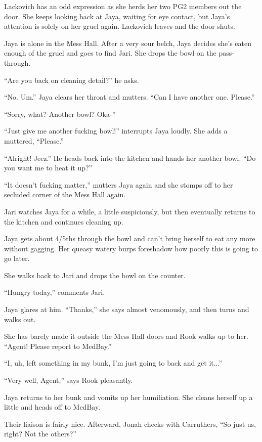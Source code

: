 Lackovich has an odd expression as she herds her two PG2 members out the door.  She keeps looking back at Jaya, waiting for eye contact, but Jaya's attention is solely on her gruel again.  Lackovich leaves and the door shuts.

Jaya is alone in the Mess Hall.  After a very sour belch, Jaya decides she's eaten enough of the gruel and goes to find Jari.  She drops the bowl on the pass-through.

``Are you back on cleaning detail?'' he asks.

``No.  Um.''  Jaya clears her throat and mutters.  ``Can I have another one.  Please.''

``Sorry, what?  Another bowl?  Oka-''

``Just give me another fucking bowl!'' interrupts Jaya loudly.  She adds a muttered, ``Please.''

``Alright!  Jeez.''  He heads back into the kitchen and hands her another bowl.  ``Do you want me to heat it up?''

``It doesn't fucking matter,'' mutters Jaya again and she stomps off to her secluded corner of the Mess Hall again.

Jari watches Jaya for a while, a little suspiciously, but then eventually returns to the kitchen and continues cleaning up.

Jaya gets about 4/5ths through the bowl and can't bring herself to eat any more without gagging.  Her queasy watery burps foreshadow how poorly this is going to go later.

She walks back to Jari and drops the bowl on the counter. 

``Hungry today,'' comments Jari.

Jaya glares at him.  ``Thanks,'' she says almost venomously, and then turns and walks out.



She has barely made it outside the Mess Hall doors and Rook walks up to her.  ``Agent!  Please report to MedBay.''

``I, uh, left something in my bunk, I'm just going to back and get it...''

``Very well, Agent,'' says Rook pleasantly.

Jaya returns to her bunk and vomits up her humiliation.  She cleans herself up a little and heads off to MedBay.





Their liaison is fairly nice.  Afterward, Jonah checks with Carruthers, ``So just us, right?  Not the others?''

